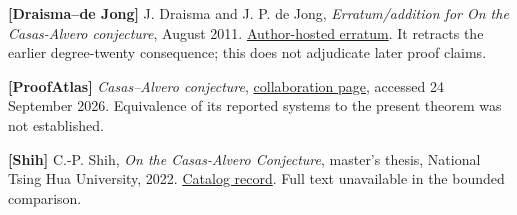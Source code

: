 \documentclass[
  british,
  10pt,
  a4paper,
]{article}
\begin{document}
\textbf{{[}Draisma--de Jong{]}} J. Draisma and J. P. de Jong,
\emph{Erratum/addition for On the Casas-Alvero conjecture}, August 2011.
\href{https://math-unibe.ch/jdraisma/publications/erratumcasasalvero.pdf}{Author-hosted
erratum}. It retracts the earlier degree-twenty consequence; this does
not adjudicate later proof claims.

\textbf{{[}ProofAtlas{]}} \emph{Casas--Alvero conjecture},
\href{https://www.proofatlas.ai/collaboration/casas-alvero-conjecture/}{collaboration
page}, accessed 24 September 2026. Equivalence of its reported systems
to the present theorem was not established.

\textbf{{[}Shih{]}} C.-P. Shih, \emph{On the Casas-Alvero Conjecture},
master's thesis, National Tsing Hua University, 2022.
\href{https://etd.lib.nycu.edu.tw/cgi-bin/gs32/hugsweb.cgi?o=dnthucdr&s=id\%3D\%22G021090215100\%22.&searchmode=basic}{Catalog
record}. Full text unavailable in the bounded comparison.
\end{document}
